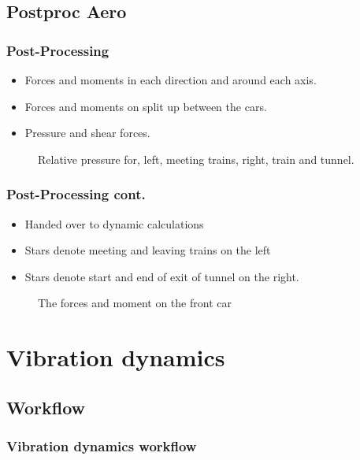 \documentclass{beamer}
\begin{document}
\subsection{Postproc Aero}
\begin{frame}
 \frametitle{Post-Processing}
 \begin{itemize}
  \item Forces and moments in each direction and around each axis.
  \item Forces and moments on split up between the cars.
  \item Pressure and shear forces.
  \end{itemize}
  \begin{figure}
	\centering
	\caption{Relative pressure for, left, meeting trains, right, train and tunnel.}
  \end{figure}
\end{frame}

\begin{frame}
 \frametitle{Post-Processing cont.}
 \begin{itemize}
  \item Handed over to dynamic calculations
  \item Stars denote meeting and leaving trains on the left
  \item Stars denote start and end of exit of tunnel on the right.
  \end{itemize}
  \begin{figure}
	\centering
	\caption{The forces and moment on the front car}
  \end{figure}
\end{frame}

\section{Vibration dynamics}
\subsection{Workflow}
\begin{frame}
 \frametitle{Vibration dynamics workflow}
 \begin{figure}
  \centering
 \end{figure}
\end{frame}
\end{document}
